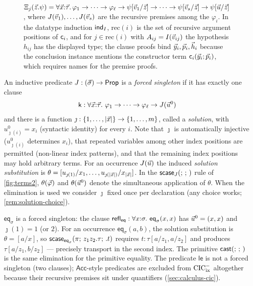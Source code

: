 \begin{figure}[tp]
{  $\Xi_j(\vec{z}.\psi) = \forall \vec{x}{:}\vec{\tau}.\,\varphi_1 \to \dots
  \to \varphi_\ell \to \psi[\vec{v}_1/\vec{z}] \to \dots \to
  \psi[\vec{v}_s/\vec{z}] \to \psi[\vec{u}/\vec{z}]$,
  where $J(\vec{v}_1), \dots, J(\vec{v}_s)$ are the recursive premises
  among the $\varphi_i$.  In the datatype induction $\mathsf{ind}_{I}$,
  $\mathrm{rec}(i)$ is the set of recursive argument positions of
  $\mathsf{c}_i$, and for $j \in \mathrm{rec}(i)$ with $A_{ij} =
  I(\vec{v}_{ij})$ the hypothesis $h_{ij}$ has the displayed type; the
  clause proofs bind $\vec{y}_i, \vec{p}_i, \vec{h}_i$ because the
  conclusion instance mentions the constructor term
  $\mathsf{c}_i(\vec{y}_i;\vec{p}_i)$, which requires names for the premise
  proofs.}
\label{fig:proofs2}
\end{figure}

\begin{definition}
\label{def:forced-singleton}
An inductive predicate $J : (\vec{\sigma}) \to \mathsf{Prop}$ is a \emph{forced
singleton} if it has exactly one clause
\[
  \mathsf{k} : \forall \vec{x}{:}\vec{\tau}.\
  \varphi_1 \to \dots \to \varphi_\ell \to J(\vec{u}^0)
\]
and there is a function $\jmath : \{1, \dots, |\vec{x}|\} \to \{1, \dots,
m\}$, called a \emph{solution}, with $u^0_{\jmath(i)} = x_i$ (syntactic
identity) for every $i$.  Note that $\jmath$ is automatically injective
($u^0_{\jmath(i)}$ determines $x_i$), that repeated variables among other
index positions are permitted (non-linear index patterns), and that the
remaining index positions may hold arbitrary terms.  For an occurrence
$J(\vec{u})$ the induced \emph{solution substitution} is $\theta =
[u_{\jmath(1)}/x_1, \dots, u_{\jmath(|\vec{x}|)}/x_{|\vec{x}|}]$.  In the
$\mathsf{scase}_{J}(;\,;\,)$ rule of \cref{fig:terms2}, $\theta(\vec{\varphi})$ and
$\theta(\vec{u}^0)$ denote the simultaneous application of $\theta$.
When the elimination is used we consider $\jmath$ fixed once per
declaration (any choice works; \cref{rem:solution-choice}).
\end{definition}

\begin{example}
$\mathsf{eq}_\sigma$ is a forced singleton: the clause
$\wcns{refl}_{\mathsf{eq}} : \forall x{:}\sigma.\ \mathsf{eq}_\sigma(x,x)$
has $\vec{u}^0 = (x, x)$ and $\jmath(1) = 1$ (or $2$).  For an occurrence
$\mathsf{eq}_\sigma(a,b)$, the solution substitution is $\theta = [a/x]$,
so $\mathsf{scase}_{\mathsf{eq}_\sigma}(\pi;\,z_1 z_2.\tau;\,.t)$ requires $t :
\tau[a/z_1, a/z_2]$ and produces $\tau[a/z_1, b/z_2]$ --- precisely
transport in the second index.  The primitive $\mathsf{cast}(;\,;\,)$ is the same
elimination for the primitive equality.  The predicate $\mathsf{le}$ is
not a forced singleton (two clauses); $\mathsf{Acc}$-style predicates are
excluded from $\mathrm{CIC}^{-}_{\mathrm{ix}}$ altogether because their recursive premises sit
under quantifiers (\cref{sec:calculus-cic}).
\end{example}

